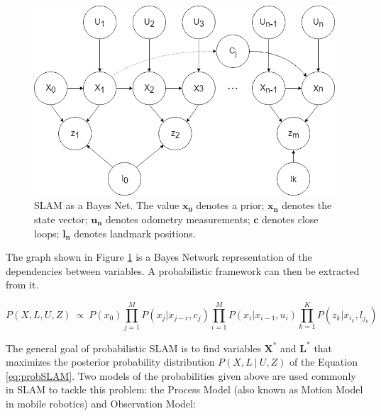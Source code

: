 \documentclass[11pt]{article}
\begin{document}
\begin{figure}
\begin{minipage}{0.65\textwidth}
\centering
\includegraphics[width=\textwidth]{BayesNetSLAM}
\end{minipage} \hfill
\begin{minipage}{0.35\textwidth}
\centering
\caption{SLAM as a Bayes Net. The value $\mathbf{x_0}$ denotes a prior; $\mathbf{x_n}$ denotes the state vector; $\mathbf{u_n}$ denotes odometry measurements; $\mathbf{c}$ denotes close loops; $\mathbf{l_n}$ denotes landmark positions.}
\label{fig:slam1}
\end{minipage}				
\end{figure}
	
The graph shown in Figure \ref{fig:slam1} is a Bayes Network representation of the dependencies between variables. A probabilistic framework can then be extracted from it. 

\begin{equation}
P(X,L,U,Z)\ \propto \ P(x_0)\prod_{j=1}^{M}P(x_j|x_{j-c},c_j)\prod_{i=1}^{M}P(x_i|x_{i-1}, u_i)\prod_{k=1}^{K}P(z_k|x_{i_k},l_{j_k})
\label{eq:probSLAM}
\end{equation}

The general goal of probabilistic SLAM is to find variables $\mathbf{X^*}$ and $\mathbf{L^*}$ that maximizes the posterior probability distribution $P(X,L\ |\ U, Z)$ of the Equation \ref{eq:probSLAM}. Two models of the probabilities given above are used commonly in SLAM to tackle this problem: the Process Model (also known as Motion Model in mobile robotics) and Observation Model:
\end{document}
